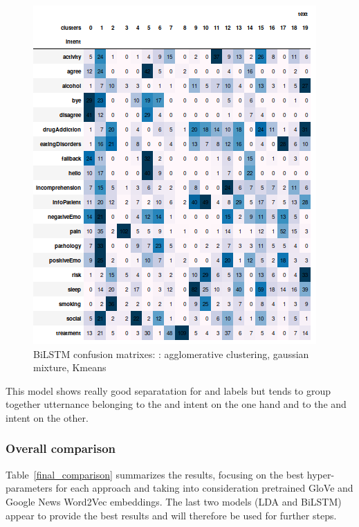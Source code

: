 \documentclass[11pt]{article}
\begin{document}
\begin{figure}[h]
	\includegraphics[scale=0.28]{bilstm_km_cm.png}
	\caption{BiLSTM confusion matrixes: : agglomerative clustering, gaussian mixture, Kmeans}
\label{bilstm_gm_cm}
\end{figure}
\FloatBarrier

This model shows really good separatation for {} and {} labels but  
tends to group together utternance belonging to the {} and  {} intent on the one hand and to the  {} and  {} intent on the other.

\subsubsection{Overall comparison}

Table~\ref{final_comparison} summarizes the results, focusing on the best hyper-parameters for each approach and  taking into consideration pretrained GloVe and Google News Word2Vec embeddings. The last two models (LDA and BiLSTM) appear to provide the best results and will therefore be used for further steps.
\end{document}
